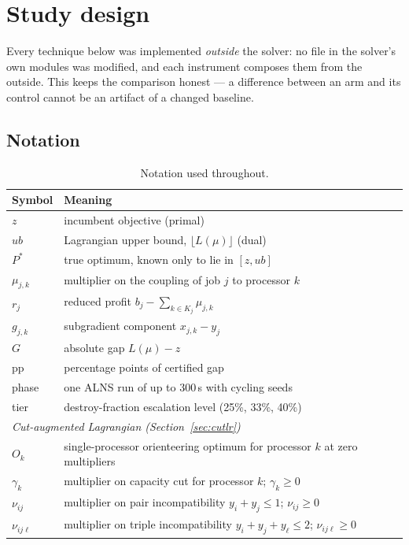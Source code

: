 \documentclass[11pt,a4paper]{article}
\newcommand{\Kj}{\ensuremath{K_j}}
\begin{document}
\section{Study design}\label{sec:design}

Every technique below was implemented \emph{outside} the solver: no file in the
solver's own modules was modified, and each instrument composes them from the
outside. This keeps the comparison honest --- a difference between an arm and its
control cannot be an artifact of a changed baseline.

\subsection{Notation}

\begin{table}[htbp]
\centering
\caption{Notation used throughout.}
\label{tab:notation}
\begin{tabular}{ll}
\toprule
Symbol & Meaning \\
\midrule
$z$ & incumbent objective (primal) \\
$ub$ & Lagrangian upper bound, $\lfloor L(\mu)\rfloor$ (dual) \\
$P^\ast$ & true optimum, known only to lie in $[z,ub]$ \\
$\mu_{j,k}$ & multiplier on the coupling of job $j$ to processor $k$ \\
$r_j$ & reduced profit $b_j-\sum_{k\in \Kj}\mu_{j,k}$ \\
$g_{j,k}$ & subgradient component $x_{j,k}-y_j$ \\
$G$ & absolute gap $L(\mu)-z$ \\
pp & percentage points of certified gap \\
phase & one ALNS run of up to 300\,s with cycling seeds \\
tier & destroy-fraction escalation level (25\%, 33\%, 40\%) \\
\midrule
\multicolumn{2}{l}{\emph{Cut-augmented Lagrangian (Section~\ref{sec:cutlr})}} \\
$O_k$ & single-processor orienteering optimum for processor $k$ at zero multipliers \\
$\gamma_k$ & multiplier on capacity cut for processor $k$; $\gamma_k\ge 0$ \\
$\nu_{ij}$ & multiplier on pair incompatibility $y_i+y_j\le 1$; $\nu_{ij}\ge 0$ \\
$\nu_{ij\ell}$ & multiplier on triple incompatibility $y_i+y_j+y_\ell\le 2$; $\nu_{ij\ell}\ge 0$ \\
\bottomrule
\end{tabular}
\end{table}
\end{document}
